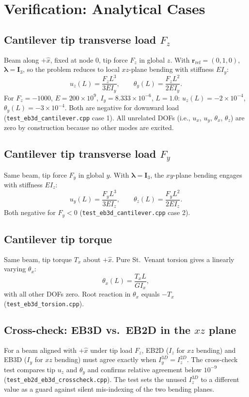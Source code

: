 \documentclass[11pt,a4paper]{article}
\newcommand{\bmath}[1]{\boldsymbol{#1}}
\begin{document}
\section{Verification: Analytical Cases}\label{sec:verification}

\subsection{Cantilever tip transverse load $F_z$}

Beam along $+\hat{x}$, fixed at node 0, tip force $F_z$ in global $z$. With $\bmath{r}_{\text{ref}} = (0,1,0)$, $\bmath{\lambda} = \bmath{I}_3$, so the problem reduces to local $xz$-plane bending with stiffness $E I_y$:
\[
u_z(L) = \frac{F_z L^3}{3 E I_y}, \qquad \theta_y(L) = \frac{F_z L^2}{2 E I_y}.
\]
For $F_z = -1000$, $E = 200{\times}10^9$, $I_y = 8.333{\times}10^{-6}$, $L = 1.0$: $u_z(L) = -2{\times}10^{-4}$, $\theta_y(L) = -3{\times}10^{-4}$. Both are negative for downward load (\texttt{test\_eb3d\_cantilever.cpp} case 1). All unrelated DOFs (i.e., $u_x$, $u_y$, $\theta_x$, $\theta_z$) are zero by construction because no other modes are excited.

\subsection{Cantilever tip transverse load $F_y$}

Same beam, tip force $F_y$ in global $y$. With $\bmath{\lambda} = \bmath{I}_3$, the $xy$-plane bending engages with stiffness $E I_z$:
\[
u_y(L) = \frac{F_y L^3}{3 E I_z}, \qquad \theta_z(L) = \frac{F_y L^2}{2 E I_z}.
\]
Both negative for $F_y < 0$ (\texttt{test\_eb3d\_cantilever.cpp} case 2).

\subsection{Cantilever tip torque}

Same beam, tip torque $T_x$ about $+\hat{x}$. Pure St.\ Venant torsion gives a linearly varying $\theta_x$:
\[
\theta_x(L) = \frac{T_x L}{G I_x},
\]
with all other DOFs zero. Root reaction in $\theta_x$ equals $-T_x$ (\texttt{test\_eb3d\_torsion.cpp}).

\subsection{Cross-check: EB3D vs.\ EB2D in the $xz$ plane}

For a beam aligned with $+\hat{x}$ under tip load $F_z$, EB2D ($I_z$ for $xz$ bending) and EB3D ($I_y$ for $xz$ bending) must agree exactly when $I_y^{3D} = I_z^{2D}$. The cross-check test compares tip $u_z$ and $\theta_y$ and confirms relative agreement below $10^{-9}$ (\texttt{test\_eb2d\_eb3d\_crosscheck.cpp}). The test sets the unused $I_z^{3D}$ to a different value as a guard against silent mis-indexing of the two bending planes.
\end{document}
